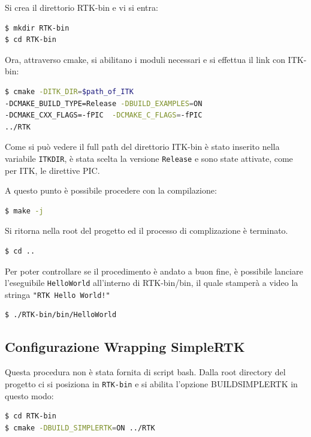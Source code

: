\documentclass[a4paper,12pt, doubleside]{report}
\begin{document}
                    \bigskip
                    Si crea il direttorio RTK-bin e vi si entra:
                    \begin{lstlisting}[language=bash, frame=bt]
$ mkdir RTK-bin
$ cd RTK-bin
                    \end{lstlisting}
                    
                    Ora, attraverso cmake, si abilitano i moduli necessari e si effettua il link con ITK-bin:
                    \begin{lstlisting}[language=bash, frame=bt]
$ cmake -DITK_DIR=$path_of_ITK 
-DCMAKE_BUILD_TYPE=Release -DBUILD_EXAMPLES=ON 
-DCMAKE_CXX_FLAGS=-fPIC  -DCMAKE_C_FLAGS=-fPIC 
../RTK
                    \end{lstlisting}
                   
                    Come si può vedere il full path del direttorio ITK-bin è stato inserito nella variabile \texttt{ITK\textunderscore DIR}, è stata scelta la versione \texttt{Release} e sono state attivate, come per ITK, le direttive PIC.
    
                    A questo punto è possibile procedere con la compilazione:
                    \begin{lstlisting}[language=bash, frame=bt]
$ make -j
                    \end{lstlisting}
                   
                    Si ritorna nella root del progetto ed il processo di complizazione è terminato.
                    \begin{lstlisting}[language=bash, frame=bt]
$ cd ..
                    \end{lstlisting}
                    
                    Per poter controllare se il procedimento è andato a buon fine, è possibile lanciare l'eseguibile \texttt{HelloWorld} all'interno di RTK-bin/bin, il quale stamperà a video la stringa \texttt{"RTK Hello World!"}
                    \begin{lstlisting}[language=bash, frame=bt]
$ ./RTK-bin/bin/HelloWorld
                    \end{lstlisting}
                    
            \subsection{Configurazione Wrapping SimpleRTK}
                \par
                    Questa procedura non è stata fornita di script bash. Dalla root directory del progetto ci si posiziona in \texttt{RTK-bin} e si abilita l'opzione BUILD\textunderscore SIMPLERTK in questo modo:
                    \begin{lstlisting}[language=bash, frame=bt]
$ cd RTK-bin
$ cmake -DBUILD_SIMPLERTK=ON ../RTK
                    \end{lstlisting}
                    
\end{document}
